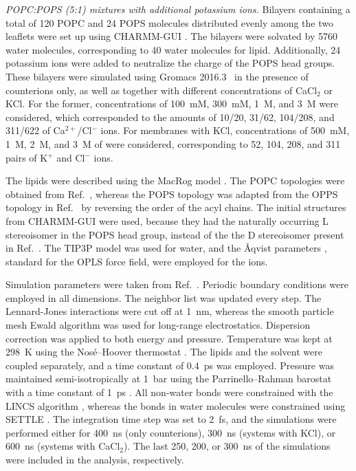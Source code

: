 \documentclass[journal=jpcbfk,manuscript=article]{achemso}
\begin{document}
\noindent
{\it POPC:POPS (5:1) mixtures with additional potassium ions.} 
Bilayers containing a total of 120 POPC and 24 POPS molecules distributed evenly among the 
two leaflets were set up using CHARMM-GUI \cite{lee16,jo18}.
The bilayers were solvated by 5760 water molecules, corresponding to 40 water molecules for lipid.
Additionally, 24 potassium ions were added to neutralize the charge of the POPS head groups.
These bilayers were simulated using Gromacs 2016.3~\cite{abraham2015gromacs} in the presence of counterions only, as well as together with different
concentrations of CaCl$_2$ or KCl. For the former, concentrations of 100~mM, 300~mM, 1~M, and 3~M 
were considered, which corresponded to the amounts of 10/20, 31/62, 104/208, and 311/622 
of Ca$^{2+}$/Cl$^-$ ions. For membranes with KCl, concentrations of 500~mM, 1~M, 2~M, and 3~M of 
were considered, corresponding to 52, 104, 208, and 311 pairs of K$^+$ and Cl$^-$ ions.

The lipids were described using the MacRog model \cite{maciejewski14,kulig15b,rog16}. The POPC topologies were obtained from 
Ref.~, whereas the POPS topology was adapted from the OPPS topology in
Ref.~ by reversing the order of the acyl chains.
The initial structures from CHARMM-GUI were used, because they had the
naturally occurring L stereoisomer in the POPS head group, instead of the 
the D stereoisomer present in Ref.~.
The TIP3P model \cite{jorgensen83} was used for water, and the \AA{}qvist parameters 
\cite{aqvist90}, standard for the OPLS force field, were employed for the ions. 

Simulation parameters were taken from Ref.~. 
Periodic boundary conditions were employed in all dimensions. The neighbor list was updated every step. 
The Lennard-Jones interactions were cut off at 1~nm, whereas the smooth particle mesh Ewald algorithm 
\cite{essman95} was used for long-range electrostatics. Dispersion correction \cite{shirts07} 
was applied to both energy and pressure. Temperature was kept at 298~K using the 
Nos\'{e}--Hoover thermostat \cite{nose84,hoover85}. The lipids and 
the solvent were coupled separately, and a time constant of 0.4~ps was employed. Pressure was 
maintained semi-isotropically at 1~bar using the Parrinello--Rahman barostat with a time constant of 1~ps 
\cite{parrinello81}. All non-water bonds were constrained with the LINCS algorithm 
\cite{hess97,hess07},
whereas the bonds in water molecules were constrained using SETTLE \cite{miyamoto92}.
The integration time step was set to 2~fs, and the simulations were performed either for 400~ns 
(only counterions), 300~ns (systems with KCl), or 600~ns (systems with CaCl$_2$). The last 
250, 200, or 300~ns of the simulations were included in the analysis, respectively.
\end{document}
